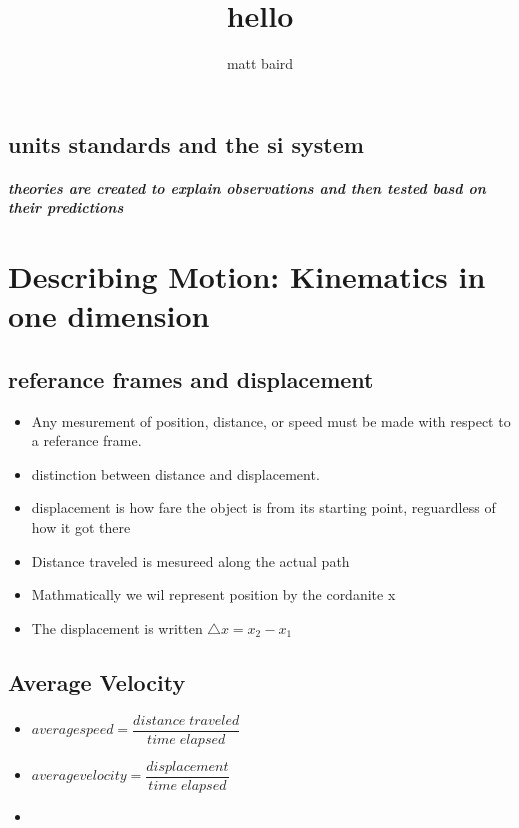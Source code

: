 \documentclass[10pt,a4paper]{report}
\author{matt baird}
\title{hello}
\begin{document}
\maketitle
\chapter{}
\section{units standards and the si system}
\paragraph{theories are created to explain observations and then tested basd on their predictions}
\chapter{Describing Motion: Kinematics in one dimension}
\paragraph{}
\section{referance frames and displacement}

\begin{itemize}
\item Any mesurement of position, distance, or speed must be made with respect to a referance frame. 
\item distinction between distance and displacement. 

\item displacement is how fare the object is from its starting point, reguardless of how it got there 
\item Distance traveled is mesureed along the actual path 
\item Mathmatically we wil represent position by the cordanite x
\item The  displacement is written   $ \bigtriangleup x = x_{2} - x_{1} $ 
\end{itemize}
\section{Average Velocity}
\begin{itemize}
\item $ average speed = \dfrac{distance \; traveled}{time \; elapsed}$
\item $ average velocity = \dfrac{displacement}{time \; elapsed}$
\item 
\end{itemize}
\end{document}
